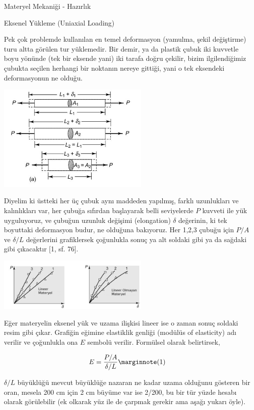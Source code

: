 \documentclass[12pt,fleqn]{article}\usepackage{../../common}
\begin{document}
Materyel Mekaniği - Hazırlık

Eksenel Yükleme (Uniaxial Loading)

Pek çok problemde kullanılan en temel deformasyon (yamulma, şekil değiştirme)
turu altta görülen tur yüklemedir. Bir demir, ya da plastik çubuk iki kuvvetle
boyu yönünde (tek bir eksende yani) iki tarafa doğru çekilir, bizim
ilgilendiğimiz çubukta seçilen herhangi bir noktanın nereye gittiği, yani
o tek eksendeki deformasyonun ne olduğu.

\includegraphics[width=20em]{phy_020_strs_00_01.jpg}

Diyelim ki üstteki her üç çubuk aynı maddeden yapılmış, farklı uzunlukları ve
kalınlıkları var, her çubuğa sıfırdan başlayarak belli seviyelerde $P$ kuvveti
ile yük uyguluyoruz, ve çubuğun uzunluk değişimi (elongation) $\delta$
değerinin, ki tek boyuttaki deformasyon budur, ne olduğuna bakıyoruz. Her 1,2,3
çubuğu için $P/A$ ve $\delta/L$ değerlerini grafiklersek çoğunlukla sonuç ya alt
soldaki gibi ya da sağdaki gibi çıkacaktır [1, sf. 76].

\includegraphics[width=20em]{phy_020_strs_00_02.jpg}

Eğer materyelin eksenel yük ve uzama ilişkisi lineer ise o zaman sonuç soldaki
resim gibi çıkar. Grafiğin eğimine elastiklik genliği (modülüs of elasticity)
adı verilir ve çoğunlukla ona $E$ sembolü verilir. Formülsel olarak belirtirsek,

$$
E = \frac{P/A}{\delta / L}
\mlabel{1}
$$

$\delta/L$ büyüklüğü mevcut büyüklüğe nazaran ne kadar uzama olduğunu gösteren
bir oran, mesela 200 cm için 2 cm büyüme var ise 2/200, bu bir tür yüzde hesabı
olarak görülebilir (ek olkarak yüz ile de çarpmak gerekir ama aşağı yukarı öyle).
\end{document}
